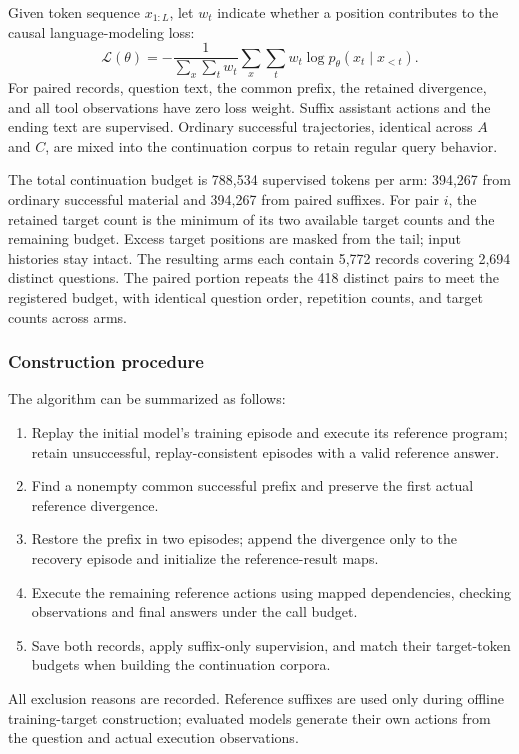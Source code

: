 \documentclass[runningheads]{llncs}
\begin{document}
Given token sequence $x_{1:L}$, let $w_t$ indicate whether a position contributes to the causal language-modeling loss:
\begin{equation}
 \mathcal{L}(\theta)=
 -\frac{1}{\sum_x\sum_t w_t}
 \sum_x\sum_t w_t\log p_\theta(x_t\mid x_{<t}).
\end{equation}
For paired records, question text, the common prefix, the retained divergence, and all tool observations have zero loss weight. Suffix assistant actions and the ending text are supervised. Ordinary successful trajectories, identical across $A$ and $C$, are mixed into the continuation corpus to retain regular query behavior.

The total continuation budget is 788,534 supervised tokens per arm: 394,267 from ordinary successful material and 394,267 from paired suffixes. For pair $i$, the retained target count is the minimum of its two available target counts and the remaining budget. Excess target positions are masked from the tail; input histories stay intact. The resulting arms each contain 5,772 records covering 2,694 distinct questions. The paired portion repeats the 418 distinct pairs to meet the registered budget, with identical question order, repetition counts, and target counts across arms.

\subsubsection{Construction procedure}
The algorithm can be summarized as follows:
\begin{enumerate}
 \item Replay the initial model's training episode and execute its reference program; retain unsuccessful, replay-consistent episodes with a valid reference answer.
 \item Find a nonempty common successful prefix and preserve the first actual reference divergence.
 \item Restore the prefix in two episodes; append the divergence only to the recovery episode and initialize the reference-result maps.
 \item Execute the remaining reference actions using mapped dependencies, checking observations and final answers under the call budget.
 \item Save both records, apply suffix-only supervision, and match their target-token budgets when building the continuation corpora.
\end{enumerate}
All exclusion reasons are recorded. Reference suffixes are used only during offline training-target construction; evaluated models generate their own actions from the question and actual execution observations.
\end{document}
